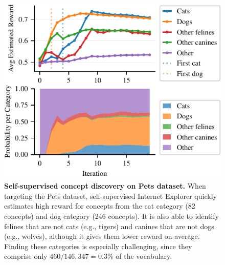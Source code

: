 \begin{figure}[t]
\centering
\includegraphics[width=0.675\linewidth]{figures/pets_ssl_reward_over_training2.pdf}
\caption{\textbf{Self-supervised concept discovery on Pets dataset.} When targeting the Pets dataset, self-supervised Internet Explorer quickly estimates high reward for concepts from the cat category (82 concepts) and dog category (246 concepts). It is also able to identify felines that are not cats (e.g., tigers) and canines that are not dogs (e.g., wolves), although it gives them lower reward on average. Finding these categories is especially challenging, since they comprise only $460/146{,}347 = 0.3\%$ of the vocabulary.}
\label{fig:reward_over_training}
\end{figure}


